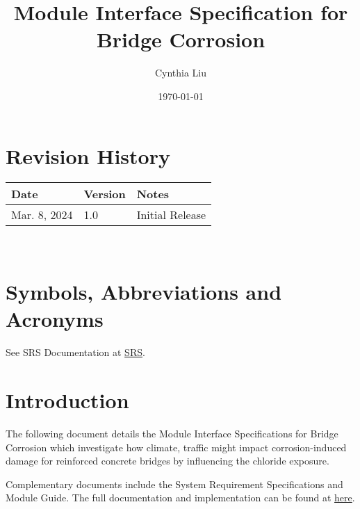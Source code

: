 \documentclass[12pt, titlepage]{article}
\begin{document}
\title{Module Interface Specification for Bridge Corrosion}

\author{Cynthia Liu}

\date{\today}

\maketitle


\section{Revision History}

\begin{tabularx}{\textwidth}{p{3cm}p{2cm}X}
\toprule {\bf Date} & {\bf Version} & {\bf Notes}\\
\midrule
Mar. 8, 2024 & 1.0 & Initial Release\\
\bottomrule
\end{tabularx}

~\newpage

\section{Symbols, Abbreviations and Acronyms}

See SRS Documentation at \href{https://github.com/CynthiaLiu0805/BridgeCorrosion/blob/main/docs/SRS/SRS.pdf}{SRS}.


\newpage

\tableofcontents

\newpage


\section{Introduction}

The following document details the Module Interface Specifications for Bridge Corrosion which investigate how climate, traffic might impact corrosion-induced
damage for reinforced concrete bridges by influencing the chloride exposure.

Complementary documents include the System Requirement Specifications
and Module Guide.  The full documentation and implementation can be
found at \href{https://github.com/CynthiaLiu0805/BridgeCorrosion}{here}.
\end{document}

